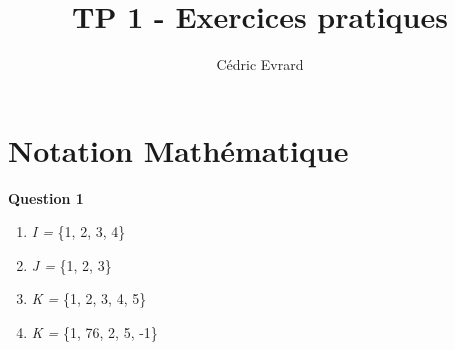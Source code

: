 \documentclass[11pt]{article}
\title{TP 1 - Exercices pratiques}
\author{Cédric Evrard}
\begin{document}
\maketitle

\section{Notation Mathématique}
\textbf{Question 1}
\begin{enumerate}
	\item \textit{I =} \{1, 2, 3, 4\}
	\item \textit{J =} \{1, 2, 3\} 
	\item \textit{K =} \{1, 2, 3, 4, 5\}
	\item \textit{K =} \{1, 76, 2, 5, -1\} 
\end{enumerate}
\end{document}

